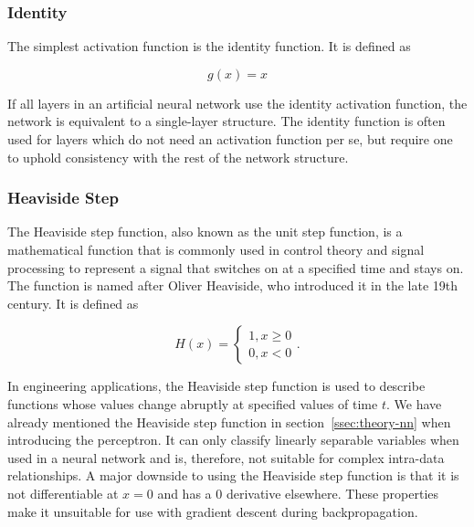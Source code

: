 \documentclass[draft,final]{vutinfth} %
\begin{document}
\subsubsection{Identity}
\label{sssec:theory-identity}

The simplest activation function is the identity function. It is defined as

\begin{equation}
  \label{eq:identity}
  g(x) = x
\end{equation}

If all layers in an artificial neural network use the identity
activation function, the network is equivalent to a single-layer
structure. The identity function is often used for layers which do not
need an activation function per se, but require one to uphold
consistency with the rest of the network structure.

\subsubsection{Heaviside Step}
\label{sssec:theory-heaviside}

The Heaviside step function, also known as the unit step function, is
a mathematical function that is commonly used in control theory and
signal processing to represent a signal that switches on at a
specified time and stays on. The function is named after Oliver
Heaviside, who introduced it in the late 19th century. It is defined
as

\begin{equation}
  \label{eq:heaviside}
  H(x) = 
  \begin{cases}
    1, x\geq 0 \\
    0, x < 0
  \end{cases}.
\end{equation}

In engineering applications, the Heaviside step function is used to
describe functions whose values change abruptly at specified values of
time $t$. We have already mentioned the Heaviside step function in
section~\ref{ssec:theory-nn} when introducing the perceptron. It can
only classify linearly separable variables when used in a neural
network and is, therefore, not suitable for complex intra-data
relationships. A major downside to using the Heaviside step function
is that it is not differentiable at $x = 0$ and has a $0$ derivative
elsewhere. These properties make it unsuitable for use with gradient
descent during 
backpropagation.
\end{document}
